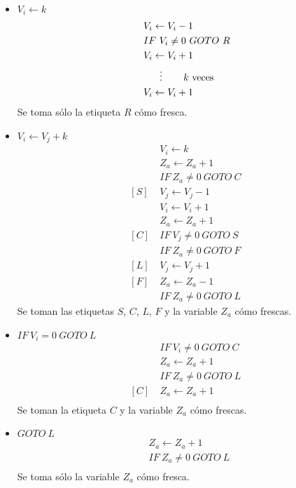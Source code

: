 \documentclass[fleqn, 11pt]{article}
\newcommand{\into}{\leftarrow}
\begin{document}
\begin{itemize}
	\item $V_i \into k$
		\begin{align*}
			[R]\ & V_i \into V_i - 1 \\
			     & IF\ V_i \neq 0\ GOTO\ R \\
			     & V_i \into V_i + 1 \\
			     & \hspace{1.5em} \vdots
			       \hspace{2em}k\ \text{veces} \\
			     & V_i \into V_i + 1
		\end{align*}
		Se toma sólo la etiqueta $R$ cómo fresca.
	\item $V_i \into V_j + k$
		\begin{align*}
			     & V_i \into k \\
			     & Z_a \into Z_a + 1 \\
			     & IF\ Z_a \neq 0\ GOTO\ C \\
			[S]\ & V_j \into V_j - 1 \\
			     & V_i \into V_i + 1 \\
			     & Z_a \into Z_a + 1 \\
			[C]\ & IF\ V_j \neq 0\ GOTO\ S \\
			     & IF\ Z_a \neq 0\ GOTO\ F \\
			[L]\ & V_j \into V_j + 1 \\
			[F]\ & Z_a \into Z_a - 1 \\
			     & IF\ Z_a \neq 0\ GOTO\ L
		\end{align*}
		Se toman las etiquetas $S$, $C$, $L$, $F$ y la variable
		$Z_a$ cómo frescas.
	\item $IF\ V_i = 0\ GOTO\ L$
		\begin{align*}
			     &IF\ V_i \neq 0\ GOTO\ C \\
			     &Z_a \into Z_a + 1 \\
			     &IF\ Z_a \neq 0\ GOTO\ L \\
			[C]\ &Z_a \into Z_a + 1 \\
		\end{align*}
		Se toman la etiqueta $C$ y la variable $Z_a$ cómo frescas.
	\item $GOTO\ L$
		\begin{align*}
			     &Z_a \into Z_a + 1 \\
			     &IF\ Z_a \neq 0\ GOTO\ L \\
		\end{align*}
		Se toma sólo la variable $Z_a$ cómo fresca.
\end{itemize}
\end{document}
